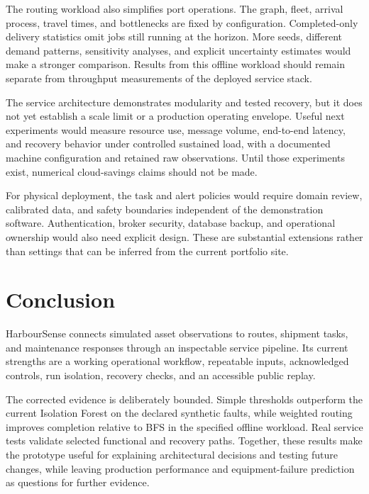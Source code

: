 \documentclass[journal]{IEEEtran}
\begin{document}
The routing workload also simplifies port operations. The graph, fleet, arrival process, travel times, and bottlenecks are fixed by configuration. Completed-only delivery statistics omit jobs still running at the horizon. More seeds, different demand patterns, sensitivity analyses, and explicit uncertainty estimates would make a stronger comparison. Results from this offline workload should remain separate from throughput measurements of the deployed service stack.

The service architecture demonstrates modularity and tested recovery, but it does not yet establish a scale limit or a production operating envelope. Useful next experiments would measure resource use, message volume, end-to-end latency, and recovery behavior under controlled sustained load, with a documented machine configuration and retained raw observations. Until those experiments exist, numerical cloud-savings claims should not be made.

For physical deployment, the task and alert policies would require domain review, calibrated data, and safety boundaries independent of the demonstration software. Authentication, broker security, database backup, and operational ownership would also need explicit design. These are substantial extensions rather than settings that can be inferred from the current portfolio site.

\section{Conclusion}
HarbourSense connects simulated asset observations to routes, shipment tasks, and maintenance responses through an inspectable service pipeline. Its current strengths are a working operational workflow, repeatable inputs, acknowledged controls, run isolation, recovery checks, and an accessible public replay.

The corrected evidence is deliberately bounded. Simple thresholds outperform the current Isolation Forest on the declared synthetic faults, while weighted routing improves completion relative to BFS in the specified offline workload. Real service tests validate selected functional and recovery paths. Together, these results make the prototype useful for explaining architectural decisions and testing future changes, while leaving production performance and equipment-failure prediction as questions for further evidence.

{\raggedright
\renewcommand{\bibfont}{\small}


}
\end{document}
